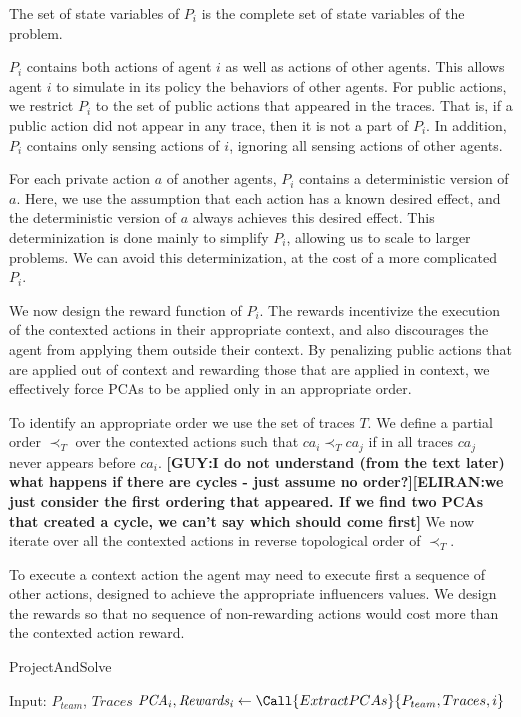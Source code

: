 \documentclass[letterpaper]{article} %
\theoremstyle{definition}
\newcommand{\eliran}[1]{\textbf{[\color{red}ELIRAN:#1]}}
\newcommand{\guy}[1]{\textbf{[\color{orange}GUY:#1]}}
\newcommand{\pcact}[1]{{\mathit{PCA}_#1}}
\begin{document}
The set of state variables of $P_i$ is the complete set of state variables of the problem.

$P_i$ contains both actions of agent $i$ as well as actions of other agents. This allows agent $i$ to simulate in its policy the behaviors of other agents.
For public actions, we restrict $P_i$ to the set of public actions that appeared in the traces. That is, if a public action did not appear in any trace, then it is not a part of $P_i$. 
In addition, $P_i$ contains only sensing actions of $i$, ignoring all sensing actions of other agents. 

For each private action $a$ of another agents, $P_i$ contains a deterministic version of $a$. Here, we use the assumption that each action has a known desired effect, and the deterministic version of $a$ always achieves this desired effect. This determinization is done mainly to simplify $P_i$, allowing us to scale to larger problems. We can avoid this determinization, at the cost of a more complicated $P_i$.

We now design the reward function of $P_i$. The rewards incentivize the execution of the contexted actions in their appropriate context, and also discourages the agent from applying them outside their context. By penalizing public actions that are applied out of context and rewarding those that are applied in context, we effectively force PCAs to be applied only in an appropriate order.

To identify an appropriate order we use the set of traces $T$. We define a partial order $\prec_T$ over the contexted actions such that $ca_i \prec_T ca_j$ if in all traces $ca_j$ never appears before $ca_i$. \guy{I do not understand (from the text later) what happens if there are cycles - just assume no order?}\eliran{we just consider the first ordering that appeared. If we find two PCAs that created a cycle, we can't say which should come first} We now iterate over all the contexted actions in reverse topological order of $\prec_T$.

To execute a context action the agent may need to execute first a sequence of other actions, designed to achieve the appropriate influencers values. We design the rewards so that no sequence of non-rewarding actions would cost more than the contexted action reward.




\begin{algorithm}
\caption{ProjectAndSolve}
\begin{algorithmic}[tbph]
\State Input: $P_{team}$, $Traces$
\State $\pcact{i},\mathit{Rewards_i} \gets \Call{ExtractPCAs}{P_{team}, Traces, i}$
\State {$\mathit{SAProblem_i}$ $\gets \Call{Project}{P_{team}, \pcact{i}, Rewards_i}$}
\EndFor
{}
\end{algorithmic}
\end{algorithm}
\end{document}
